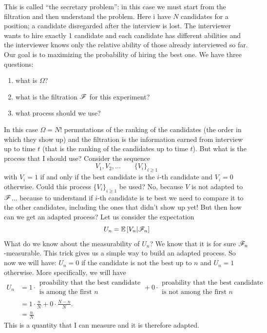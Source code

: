\documentclass{report}
\begin{document}
\begin{example}
	This is called ``the secretary problem'': in this case we must start from the filtration and then understand the problem.
	Here i have $N$ candidates for a position; a candidate disregarded after the interview is lost. The interviewer wants to hire exactly 1 candidate and each candidate has different abilities and the interviewer knows only the relative ability of those already interviewed so far. Our goal is to maximizing the probability of hiring the best one. We have three questions:
	\begin{enumerate}
		\item what is $\Omega$?
		\item what is the filtration $\mathscr{F}$ for this experiment?
		\item what process should we use?
	\end{enumerate}
	In this case $\Omega=N!$ permutations of the ranking of the candidates (the order in which they show up) and the filtration is the information earned from interview up to time $t$ (that is the ranking of the candidates up to time $t$). But what is the process that I should use? Consider the sequence
	\[V_1,V_2,\ldots\qquad{\{V_i\}}_{i\geq 1}\]
	with $V_i=1$ if and only if the best candidate is the $i$-th candidate and $V_i=0$ otherwise. Could this process ${\{V_i\}}_{i\geq 1}$ be used? No, because $V$ is not adapted to $\mathscr{F}$... because to understand if $i$-th candidate is te best we need to compare it to the other candidates, including the ones that didn't show up yet! But then how can we get an adapted process? Let us consider the expectation
	\[U_n=\mathbb{E}\left[V_n|\mathscr{F}_n\right]\]
	What do we know about the measurability of $U_n$? We know that it is for sure $\mathscr{F}_n$-measurable. This trick gives us a simple way to build an adapted process. So now we will have:
	$U_n=
		0$ if the candidate is not the best up to $n$ and $U_n=1$ otherwise. More specifically, we will have
		\begin{align*}
			U_n&=1\cdot\substack{\text{proability that the best candidate}\\\text{is among the first $n$}}+0\cdot\substack{\text{proability that the best candidate}\\\text{is not among the first $n$}}\\
			&=1\cdot\frac{n}{N}+0\cdot\frac{N-n}{N}.\\
			&=\frac{n}{N}
		\end{align*}
	This is a quantity that I can measure and it is therefore adapted.\par
\end{example}
\end{document}
